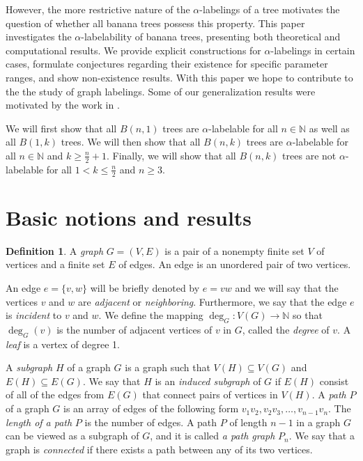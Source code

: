 \documentclass[10pt]{article}
\theoremstyle{definition}
\newtheorem{definition}{Definition}
\begin{document}
However, the more restrictive nature of the $\alpha$-labelings of a tree motivates the question of whether all banana trees possess this property.
This paper investigates the $\alpha$-labelability of banana trees, presenting both theoretical and computational results. We provide explicit constructions for $\alpha$-labelings in certain cases, formulate conjectures regarding their existence for specific parameter ranges, and show non-existence results. With this paper we hope to contribute to the the study of graph labelings. Some of our generalization results were motivated by the work in \cite{MMK14}.

We will first show that all $B(n, 1)$ trees are $\alpha$-labelable for all $n \in \mathbb{N}$ as well as all $B(1, k)$ trees. We will then show that all $B(n, k)$ trees are $\alpha$-labelable for all $n \in \mathbb{N}$ and $k \geq \frac{n}{2} + 1$. Finally, we will show that all $B(n, k)$ trees are not $\alpha$-labelable for all $1 < k \le \frac{n}{2}$ and $n \geq 3$.

\section{Basic notions and results}

\begin{definition}
  A \textit{graph} $G = (V, E)$ is a pair of a nonempty finite set $V$  of vertices and a finite set $E$ of edges. An edge is an unordered pair of two vertices.
\end{definition}
An edge $e = \{v, w\}$ will be briefly denoted by $e = vw$ and we will say that the vertices $v$ and $w$ are \textit{adjacent} or \textit{neighboring}. Furthermore, we say that the edge $e$ is \textit{incident} to $v$ and $w$. We define the mapping $\deg_G: V(G) \rightarrow \mathbb{N}$ so that $\deg_G(v)$ is the number of adjacent vertices of $v$ in $G$, called the \textit{degree} of $v$. A \textit{leaf} is a vertex of degree 1.

A \textit{subgraph} $H$ of a graph $G$ is a graph such that $V(H) \subseteq V(G)$ and $E(H) \subseteq E(G)$. We say that $H$ is an \textit{induced subgraph} of $G$ if $E(H)$ consist of all of the edges from $E(G)$ that connect pairs of vertices in $V(H)$. A \textit{path} $P$ of a graph $G$ is an array of edges of the following form $v_1 v_2, v_2 v_3, \dots, v_{n-1} v_n$. The \textit{length of a path} $P$ is the number of edges. A path $P$ of length $n - 1$ in a graph $G$ can be viewed as a subgraph of $G$, and it is called \textit{a path graph} $P_n$. We say that a graph is \textit{connected} if there exists a path between any of its two vertices.
\end{document}
